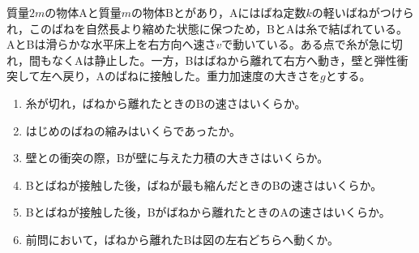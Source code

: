 \hakosyokika
\item
    \begin{mawarikomi}{200pt}{}
        質量$2m$の物体Aと質量$m$の物体Bとがあり，Aにはばね定数$k$の軽いばねがつけられ，このばねを自然長より縮めた状態に保つため，BとAは糸で結ばれている。AとBは滑らかな水平床上を右方向へ速さ$v$で動いている。ある点で糸が急に切れ，間もなくAは静止した。一方，Bはばねから離れて右方へ動き，壁と弾性衝突して左へ戻り，Aのばねに接触した。重力加速度の大きさを$g$とする。
        \begin{enumerate}
            \item 糸が切れ，ばねから離れたときのBの速さはいくらか。
            \item はじめのばねの縮みはいくらであったか。
            \item 壁との衝突の際，Bが壁に与えた力積の大きさはいくらか。
            \item Bとばねが接触した後，ばねが最も縮んだときのBの速さはいくらか。
            \item Bとばねが接触した後，Bがばねから離れたときのAの速さはいくらか。
            \item 前問において，ばねから離れたBは図の左右どちらへ動くか。
        \end{enumerate}
    \end{mawarikomi}